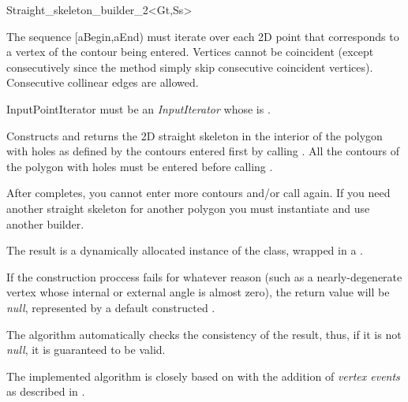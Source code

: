 \begin{ccRefClass}{Straight_skeleton_builder_2<Gt,Ss>}
{The sequence [aBegin,aEnd) must iterate over each 2D point that corresponds to a vertex of the contour being entered. Vertices cannot be coincident (except consecutively since the method simply skip consecutive coincident vertices). Consecutive collinear edges are allowed.

InputPointIterator must be an \textit{InputIterator} whose  is .}
   
\ccGlue
{}
{Constructs and returns the 2D straight skeleton in the interior of the polygon with holes as defined by the contours entered first by calling . All the contours of the polygon with holes must be entered before calling .

After  completes, you cannot enter more contours and/or call  again. If you need another straight skeleton for another polygon you must instantiate and use another builder.

The result is a dynamically allocated instance of the  class, wrapped in a .

If the construction proccess fails for whatever reason (such as a nearly-degenerate vertex whose internal or external angle is almost zero), the return value will be {\em null}, represented by a default constructed .

The algorithm automatically checks the consistency of the result, thus, if it is not {\em null}, it is guaranteed to be valid.
}




The implemented algorithm is closely based on \cite{cgal:fo-ss-98} with the addition of \textit{vertex events} as described in \cite{cgal:ee-rrccpp-98}.


\end{ccRefClass}
